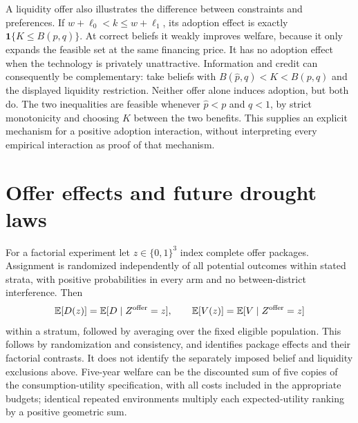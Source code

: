 \documentclass[11pt,a4paper]{article}
\theoremstyle{remark}
\newcommand{\E}{\mathbb E}
\newcommand{\ind}{\mathbf 1}
\begin{document}
A liquidity offer also illustrates the difference between constraints and preferences. If $w+\ell_0<k\le w+\ell_1$, its adoption effect is exactly $\ind\{K\le B(\widehat p,q)\}$. At correct beliefs it weakly improves welfare, because it only expands the feasible set at the same financing price. It has no adoption effect when the technology is privately unattractive. Information and credit can consequently be complementary: take beliefs with $B(\widehat p,q)<K<B(p,q)$ and the displayed liquidity restriction. Neither offer alone induces adoption, but both do. The two inequalities are feasible whenever $\widehat p<p$ and $q<1$, by strict monotonicity and choosing $K$ between the two benefits. This supplies an explicit mechanism for a positive adoption interaction, without interpreting every empirical interaction as proof of that mechanism.

\section{Offer effects and future drought laws}
For a factorial experiment let $z\in\{0,1\}^3$ index complete offer packages. Assignment is randomized independently of all potential outcomes within stated strata, with positive probabilities in every arm and no between-district interference. Then
\[
 \E[D(z)]=\E[D\mid Z^{\rm offer}=z],\qquad
 \E[V(z)]=\E[V\mid Z^{\rm offer}=z]
\]
within a stratum, followed by averaging over the fixed eligible population. This follows by randomization and consistency, and identifies package effects and their factorial contrasts. It does not identify the separately imposed belief and liquidity exclusions above. Five-year welfare can be the discounted sum of five copies of the consumption-utility specification, with all costs included in the appropriate budgets; identical repeated environments multiply each expected-utility ranking by a positive geometric sum.
\end{document}

